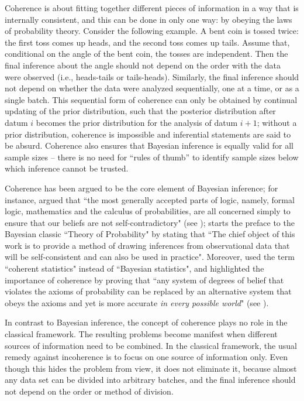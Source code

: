 Coherence is about fitting together different pieces of information in a way that is internally consistent, and this can be done in only one way: by obeying the laws of probability theory. Consider the following example. A bent coin is tossed twice: the first toss comes up heads, and the second toss comes up tails. Assume that, conditional on the angle of the bent coin, the tosses are independent. Then the final inference about the angle should not depend on the order with the data were observed (i.e., heads-tails or tails-heads). Similarly, the final inference should not depend on whether the data were analyzed sequentially, one at a time, or as a single batch. This sequential form of coherence can only be obtained by continual updating of the prior distribution, such that the posterior distribution after datum $i$ becomes the prior distribution for the analysis of datum $i+1$; without a prior distribution, coherence is impossible and inferential statements are said to be absurd. Coherence also ensures that Bayesian inference is equally valid for all sample sizes -- there is no need for ``rules of thumb'' to identify sample sizes below which inference cannot be trusted.

Coherence has been argued to be the core element of Bayesian inference; for instance,  argued that ``the most generally accepted parts of logic, namely, formal logic, mathematics and the calculus of probabilities, are all concerned simply to ensure that our beliefs are not self-contradictory" (see );  starts the preface to the Bayesian classic ``Theory of Probability" by stating that ``The chief object of this work is to provide a method of drawing inferences from observational data that will be self-consistent and can also be used in practice". Moreover,  used the term ``coherent statistics" instead of ``Bayesian statistics", and  highlighted the importance of coherence by proving that ``any system of degrees of belief that violates the axioms of probability can be replaced by an alternative system that obeys the axioms and yet is more accurate \emph{in every possible world}" (see ).

In contrast to Bayesian inference, the concept of coherence plays no role in the classical framework. The resulting problems become manifest when different sources of information need to be combined. In the classical framework, the usual remedy against incoherence is to focus on one source of information only. Even though this hides the problem from view, it does not eliminate it, because almost any data set can be divided into arbitrary batches, and the final inference should not depend on the order or method of division.

